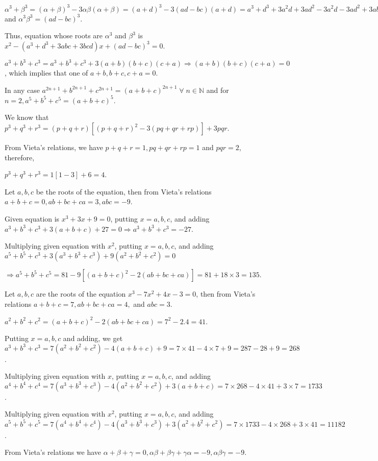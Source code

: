   $\alpha^3 + \beta^3 = (\alpha + \beta)^3 - 3\alpha\beta(\alpha + \beta) = (a + d)^3 - 3(ad - bc)(a + d) =
  a^3 + d^3 + 3a^2d + 3ad^2 - 3a^2d - 3ad^2 + 3abc + 3bcd = a^3 + d^3 + 3abc + 3bcd$ and $\alpha^3\beta^3 =
  (ad - bc)^3$.

  Thus, equation whose roots are $\alpha^3$ and $\beta^3$ is $x^2 - (a^3 + d^3 + 3abc + 3bcd)x + (ad - bc)^3
  = 0$.
\item $a^3 + b^3 + c^3 = a^3 + b^3 + c^3 + 3(a + b)(b + c)(c + a)\Rightarrow (a + b)(b + c)(c + a) = 0$,
  which implies that one of $a + b, b + c, c + a = 0$.

  In any case $a^{2n + 1} + b^{2n + 1} + c^{2n + 1} = (a + b + c)^{2n + 1}\;\forall\;n\in\mathbb{N}$ and for
  $n = 2, a^5 + b^5 + c^5 = (a + b + c)^5$.
\item We know that $p^3 + q^3 + r^3 = (p + q + r)[(p + q + r)^2 - 3(pq + qr + rp)] + 3pqr$.

  From Vieta's relations, we have $p + q + r = 1, pq + qr + rp = 1$ and $pqr = 2$, therefore,

  $p^3 + q^3 + r^3 = 1[1 - 3] + 6 = 4$.
\item Let $a, b, c$ be the roots of the equation, then from Vieta's relations $a + b + c = 0, ab + bc + ca =
  3, abc = -9$.

  Given equation is $x^3 + 3x + 9 = 0$, putting $x = a, b, c$, and adding $a^3 + b^3 + c^3 + 3(a + b + c) +
  27 = 0 \Rightarrow a^3 + b^3 + c^3 = -27$.

  Multiplying given equation with $x^2$, putting $x = a, b, c$, and adding $a^5 + b^5 + c^3 + 3(a^3 + b^3 +
  c^3) + 9(a^2 + b^2 + c^2) = 0$

  $\Rightarrow a^5 + b^5 + c^5 = 81 - 9[(a + b + c)^2 - 2(ab + bc + ca)] = 81 + 18\times 3 = 135$.
\item Let $a, b, c$ are the roots of the equation $x^3 - 7x^2 + 4x - 3 = 0$, then from Vieta's relations $a
  + b + c = 7, ab + bc + ca = 4,$ and $abc = 3$.

  $a^2 + b^2 + c^2 = (a + b + c)^2 - 2(ab + bc + ca) = 7^2 - 2.4 = 41$.

  Putting $x = a, b, c$ and adding, we get $a^3 + b^3 + c^3 = 7(a^2 + b^2 + c^2) - 4(a + b + c) + 9 =
  7\times41 - 4\times7 + 9 = 287 - 28 + 9 = 268$.

  Multiplying given equation with $x$, putting $x = a, b, c$, and adding $a^4 + b^4 + c^4 = 7(a^3 + b^3 +
  c^3) - 4(a^2 + b^2 + c^2) + 3(a + b + c) = 7\times268 - 4\times41 + 3\times7 = 1733$.

  Multiplying given equation with $x^2$, putting $x = a, b, c$, and adding $a^5 + b^5 + c^5 = 7(a^4 + b^4 +
  c^4) - 4(a^3 + b^3 + c^3) + 3(a^2 + b^2 + c^2) = 7\times1733 - 4\times268 + 3\times41 = 11182$.
\item From Vieta's relations we have $\alpha + \beta + \gamma = 0, \alpha\beta + \beta\gamma + \gamma\alpha
  = -9, \alpha\beta\gamma = -9$.

